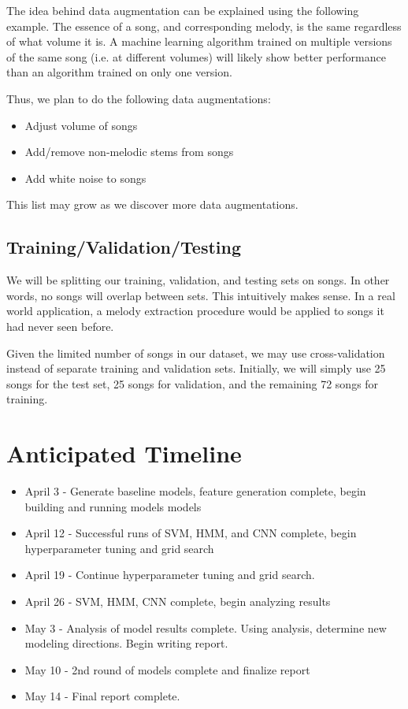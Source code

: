 \documentclass{article} %
\begin{document}
The idea behind data augmentation can be explained using the following example.  The essence of a song, and corresponding melody, is the same regardless of what volume it is.  A machine learning algorithm trained on multiple versions of the same song (i.e. at different volumes) will likely show better performance than an algorithm trained on only one version.

Thus, we plan to do the following data augmentations:

\begin{itemize}
\item Adjust volume of songs
\item Add/remove non-melodic stems from songs
\item Add white noise to songs
\end{itemize}

This list may grow as we discover more data augmentations.

\subsection{Training/Validation/Testing}

We will be splitting our training, validation, and testing sets on songs.  In other words, no songs will overlap between sets.  This intuitively makes sense.  In a real world application, a melody extraction procedure would be applied to songs it had never seen before. 

Given the limited number of songs in our dataset, we may use cross-validation instead of separate training and validation sets.  Initially, we will simply use 25 songs for the test set, 25 songs for validation, and the remaining 72 songs for training.



\section{Anticipated Timeline}

\begin{itemize}
\item April 3 - Generate baseline models, feature generation complete, begin building and running models models
\item April 12 - Successful runs of SVM, HMM, and CNN complete, begin hyperparameter tuning and grid search
\item April 19 - Continue hyperparameter tuning and grid search.
\item April 26 - SVM, HMM, CNN complete, begin analyzing results
\item May 3 - Analysis of model results complete.  Using analysis, determine new modeling directions.  Begin writing report.
\item May 10 - 2nd round of models complete and finalize report
\item May 14 - Final report complete.
\end{itemize}
\end{document}
